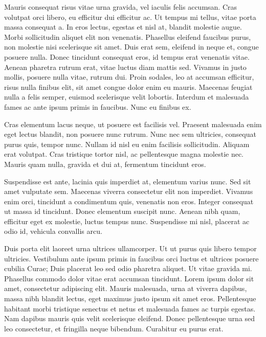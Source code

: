 \documentclass{article}
\begin{document}
	Mauris consequat risus vitae urna gravida, vel iaculis felis accumsan. Cras volutpat orci libero, eu efficitur dui efficitur ac. Ut tempus mi tellus, vitae porta massa consequat a. In eros lectus, egestas et nisl at, blandit molestie augue. Morbi sollicitudin aliquet elit non venenatis. Phasellus eleifend faucibus purus, non molestie nisi scelerisque sit amet. Duis erat sem, eleifend in neque et, congue posuere nulla. Donec tincidunt consequat eros, id tempus erat venenatis vitae. Aenean pharetra rutrum erat, vitae luctus diam mattis sed. Vivamus in justo mollis, posuere nulla vitae, rutrum dui. Proin sodales, leo at accumsan efficitur, risus nulla finibus elit, sit amet congue dolor enim eu mauris. Maecenas feugiat nulla a felis semper, euismod scelerisque velit lobortis. Interdum et malesuada fames ac ante ipsum primis in faucibus. Nunc eu finibus ex.
	
	Cras elementum lacus neque, ut posuere est facilisis vel. Praesent malesuada enim eget lectus blandit, non posuere nunc rutrum. Nunc nec sem ultricies, consequat purus quis, tempor nunc. Nullam id nisl eu enim facilisis sollicitudin. Aliquam erat volutpat. Cras tristique tortor nisl, ac pellentesque magna molestie nec. Mauris quam nulla, gravida et dui at, fermentum tincidunt eros.
	
	Suspendisse est ante, lacinia quis imperdiet at, elementum varius nunc. Sed sit amet vulputate sem. Maecenas viverra consectetur elit non imperdiet. Vivamus enim orci, tincidunt a condimentum quis, venenatis non eros. Integer consequat ut massa id tincidunt. Donec elementum suscipit nunc. Aenean nibh quam, efficitur eget ex molestie, luctus tempus nunc. Suspendisse mi nisl, placerat ac odio id, vehicula convallis arcu.
	
	Duis porta elit laoreet urna ultrices ullamcorper. Ut ut purus quis libero tempor ultricies. Vestibulum ante ipsum primis in faucibus orci luctus et ultrices posuere cubilia Curae; Duis placerat leo sed odio pharetra aliquet. Ut vitae gravida mi. Phasellus commodo dolor vitae erat accumsan tincidunt. Lorem ipsum dolor sit amet, consectetur adipiscing elit. Mauris malesuada, urna at viverra dapibus, massa nibh blandit lectus, eget maximus justo ipsum sit amet eros. Pellentesque habitant morbi tristique senectus et netus et malesuada fames ac turpis egestas. Nam dapibus mauris quis velit scelerisque eleifend. Donec pellentesque urna sed leo consectetur, et fringilla neque bibendum. Curabitur eu purus erat.
	
\end{document}
